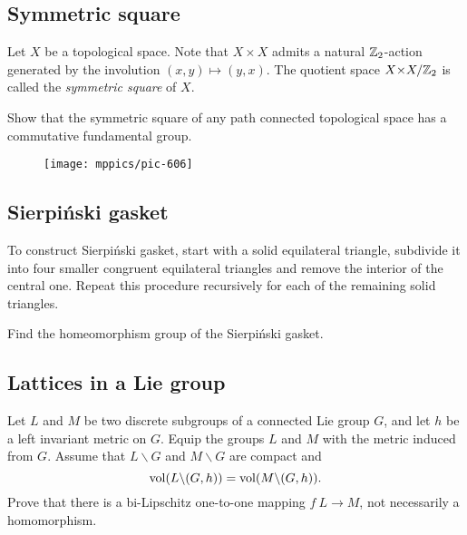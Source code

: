 \subsection*{Symmetric square\easy}\label{Symmetric square}

Let $X$ be a topological space.
Note that $X{\times} X$ admits a natural $\mathbb{Z}_2$-action generated by the involution $(x,y)\mapsto (y,x)$.
The quotient  space $X{\times} X/\mathbb{Z}_2$ is called the \emph{symmetric square} of $X$.

\begin{pr} 
Show that the symmetric square 
of any path connected topological space 
has a commutative fundamental group.
\end{pr}

{

\begin{wrapfigure}{r}{23 mm}
\vskip-0mm
\centering
\texttt{[image: mppics/pic-606]}
\end{wrapfigure}

\subsection*{Sierpi\'nski gasket\easy}\label{Sierpinski triangle}

To construct Sierpi\'nski gasket, start with a solid  equilateral triangle, subdivide it into four smaller congruent equilateral triangles and remove the interior of the central one.
Repeat this procedure recursively for each of the remaining solid triangles.

}

\begin{pr} 
Find the homeomorphism group of the Sierpi\'nski gasket.
\end{pr}



\subsection*{Lattices in a Lie group}\label{Boys and girls in a Lie group}

\begin{pr}
Let $L$ and $M$ be two discrete subgroups of a connected Lie group $G$,
and let $h$ be a left invariant metric on $G$.
Equip the groups $L$ and $M$ 
with the metric induced from $G$.
Assume that $L\backslash G$ and $M\backslash G$ are compact and
$$\operatorname{\rm vol}\nolimits(L\backslash (G,h))
=
\operatorname{\rm vol}\nolimits(M\backslash (G,h)).$$
Prove that there is a bi-Lipschitz one-to-one mapping $f\:L
\to
M$, not necessarily a homomorphism.
\end{pr}


